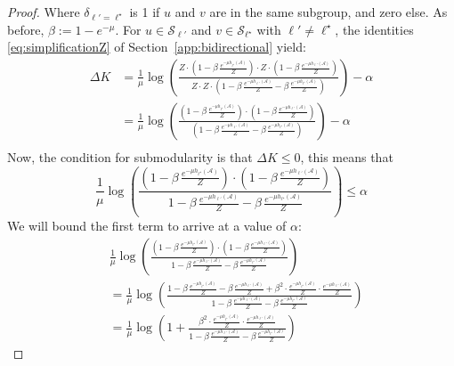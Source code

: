 \documentclass{article}
\def \setA{\mathcal{A}}
\def \setS{\mathcal{S}}
\begin{document}
\begin{proof}
Where $\delta_{\ell' = \ell^\star}$ is 1 if $u$ and $v$ are in the same subgroup, and zero else. As before, $\beta := 1 - e^{-\mu}$. For $u \in \setS_{\ell'}$ and $v \in \setS_{\ell^\star}$ with $\ell' \neq \ell^\star$, the identities \eqref{eq:simplificationZ} of Section~\ref{app:bidirectional} yield:
\begin{align*}
	\Delta K &= \frac{1}{\mu}\log\left(\frac{Z\cdot\left(1 - \beta\, \tfrac{e^{-\mu h_{\ell^\star}(\setA)}}{Z}\right)\cdot Z \cdot \left(1 - \beta\, \tfrac{e^{-\mu h_{\ell'}(\setA)}}{Z}\right)}{Z\cdot Z\cdot \left(1 - \beta\,\frac{ e^{-\mu h_{\ell'}(\setA)}}{Z} - \beta\, \frac{e^{-\mu h_{\ell^\star}(\setA)}}{Z} \right)} \right) - \alpha\\
	&=\frac{1}{\mu}\log\left(\frac{\left(1 - \beta\, \tfrac{e^{-\mu h_{\ell^\star}(\setA)}}{Z}\right)\cdot \left(1 - \beta\, \tfrac{e^{-\mu h_{\ell'}(\setA)}}{Z}\right)}{ \left(1- \beta\,\frac{ e^{-\mu h_{\ell'}(\setA)}}{Z} - \beta\, \frac{e^{-\mu h_{\ell^\star}(\setA)}}{Z} \right) } \right) - \alpha\\
\end{align*}
\noindent
Now, the condition for submodularity is that $\Delta K \leq 0$, this means that
\begin{equation}
	\frac{1}{\mu}\log\left(\frac{\left(1 - \beta\, \tfrac{e^{-\mu h_{\ell^\star}(\setA)}}{Z}\right)\cdot \left(1 - \beta\, \tfrac{e^{-\mu h_{\ell'}(\setA)}}{Z}\right)}{1- \beta\,\frac{ e^{-\mu h_{\ell'}(\setA)}}{Z} - \beta\, \frac{e^{-\mu h_{\ell^\star}(\setA)}}{Z}} \right) \leq \alpha
\end{equation}
We will bound the first term to arrive at a value of $\alpha$:
\begin{align*}
	&\frac{1}{\mu}\log\left(\frac{\left(1 - \beta\, \tfrac{e^{-\mu h_{\ell^\star}(\setA)}}{Z}\right)\cdot \left(1 - \beta\, \tfrac{e^{-\mu h_{\ell'}(\setA)}}{Z}\right)}{1- \beta\,\frac{ e^{-\mu h_{\ell'}(\setA)}}{Z} - \beta\, \frac{e^{-\mu h_{\ell^\star}(\setA)}}{Z}} \right)\\
	&= \frac{1}{\mu} \log\left(\frac{1 - \beta\, \tfrac{e^{-\mu h_{\ell^\star}(\setA)}}{Z} - \beta\, \tfrac{e^{-\mu h_{\ell'}(\setA)}}{Z} + \beta^2\cdot  \tfrac{e^{-\mu h_{\ell^\star}(\setA)}}{Z} \cdot  \tfrac{e^{-\mu h_{\ell'}(\setA)}}{Z}}{1- \beta\,\frac{ e^{-\mu h_{\ell'}(\setA)}}{Z} - \beta\, \frac{e^{-\mu h_{\ell^\star}(\setA)}}{Z}} \right)\\
	&=\frac{1}{\mu}\log\left(1+ \frac{\beta^2\cdot  \tfrac{e^{-\mu h_{\ell^\star}(\setA)}}{Z} \cdot  \tfrac{e^{-\mu h_{\ell'}(\setA)}}{Z}}{1- \beta\,\frac{ e^{-\mu h_{\ell'}(\setA)}}{Z} - \beta\, \frac{e^{-\mu h_{\ell^\star}(\setA)}}{Z}}\right)

\end{align*}
\end{proof}
\end{document}
